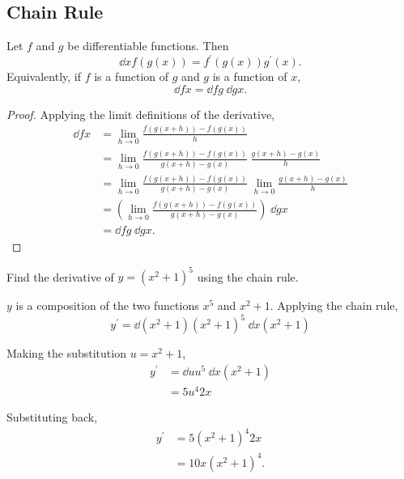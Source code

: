 \subsection{Chain Rule}
\begin{lemma}
	Let $f$ and $g$ be differentiable functions. Then
	\begin{equation}
		\dd{}{x}f(g(x)) = f^\prime(g(x))g^\prime(x).
	\end{equation}
	Equivalently, if $f$ is a function of $g$ and $g$ is a function of $x$,
	\begin{equation}
		\dd{f}{x} = \dd{f}{g}\hspace{3pt}\dd{g}{x}.
	\end{equation}
\end{lemma}
\begin{proof}
	Applying the limit definitions of the derivative,
	\begin{align*}
		\dd{f}{x} &= \lim_{h \to 0}{\frac{f(g(x+h))-f(g(x))}{h}} \\
		&= \lim_{h\to 0}{\frac{f(g(x+h))-f(g(x))}{g(x+h)-g(x)}\hspace{3pt}\frac{g(x+h)-g(x)}{h}} \\
		&= \lim_{h\to 0}{\frac{f(g(x+h))-f(g(x))}{g(x+h)-g(x)}} \hspace{3pt} \lim_{h\to 0}{\frac{g(x+h)-g(x)}{h}} \\
		&= \left(\lim_{h\to 0}{\frac{f(g(x+h))-f(g(x))}{g(x+h)-g(x)}}\right) \hspace{3pt} \dd{g}{x} \\
		&= \dd{f}{g}\hspace{3pt}\dd{g}{x}.
	\end{align*}
\end{proof}

\begin{example}
	Find the derivative of $y = (x^2 + 1)^5$ using the chain rule.
\end{example}
\begin{answer}
	$y$ is a composition of the two functions $x^5$ and $x^2 + 1$.
	Applying the chain rule, 
	\begin{equation*}
		y^\prime = \dd{}{(x^2+1)}(x^2+1)^5 \hspace{3pt} \dd{}{x}(x^2+1)
	\end{equation*}
	
	Making the substitution $u = x^2 + 1$,
	\begin{align*}
		y^\prime &= \dd{}{u}u^5 \hspace{3pt} \dd{}{x}(x^2+1) \\
		&= 5u^{4}2x
	\end{align*}
	
	Substituting back,
	\begin{align*}
		y^\prime &= 5(x^2+1)^{4}2x \\
		&= 10x(x^2+1)^4.
	\end{align*}
\end{answer}

